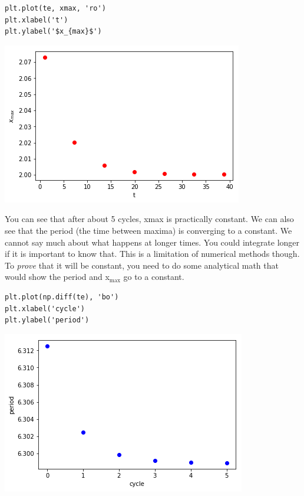 \documentclass[11pt]{article}
\begin{document}
\begin{verbatim}
plt.plot(te, xmax, 'ro')
plt.xlabel('t')
plt.ylabel('$x_{max}$')
\end{verbatim}

\begin{center}
\includegraphics[width=.9\linewidth]{obipy-resources/c515c00ecd6370edf5b32608ff70731e-38847DPR.png}
\end{center}

You can see that after about 5 cycles, xmax is practically constant. We can also see that the period (the time between maxima) is converging to a constant. We cannot say much about what happens at longer times. You could integrate longer if it is important to know that. This is a limitation of numerical methods though. To \emph{prove} that it will be constant, you need to do some analytical math that would show the period and x\(_{\text{max}}\) go to a constant.

\begin{verbatim}
plt.plot(np.diff(te), 'bo')
plt.xlabel('cycle')
plt.ylabel('period')
\end{verbatim}

\begin{center}
\includegraphics[width=.9\linewidth]{obipy-resources/c515c00ecd6370edf5b32608ff70731e-38847QZX.png}
\end{center}
\end{document}
